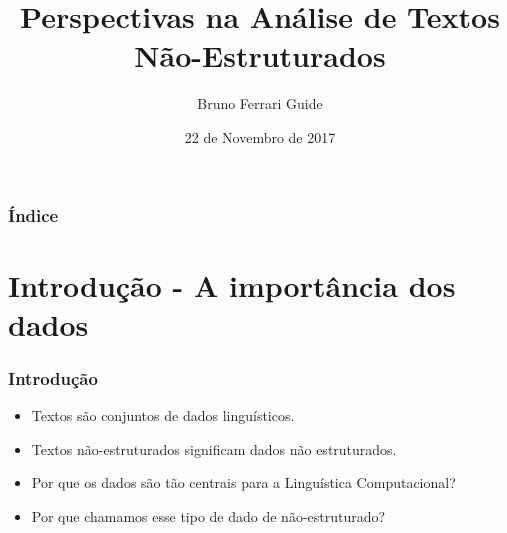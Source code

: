 \documentclass[11pt]{beamer}
\begin{document}
	\author{Bruno Ferrari Guide}
	\title{Perspectivas na Análise de Textos Não-Estruturados}
	\date{22 de Novembro de 2017}
	\begin{frame}[plain]
	\maketitle
\end{frame}

\begin{frame}
\frametitle{Índice} %
\tableofcontents %
\end{frame}

\section{Introdução - A importância dos dados}



\begin{frame}
\frametitle{Introdução}
\begin{itemize}
	\item Textos são conjuntos de dados linguísticos.\\
	\item Textos não-estruturados significam dados não estruturados.\\
	\item Por que os dados são tão centrais para a Linguística Computacional?\\
	\item Por que chamamos esse tipo de dado de não-estruturado?\\
\end{itemize}
\end{frame}
\end{document}
